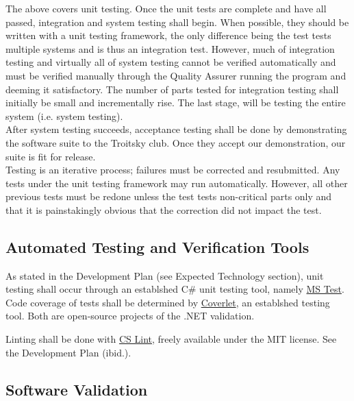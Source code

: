 \documentclass[12pt, titlepage]{article}
\begin{document}
The above covers unit testing. Once the unit tests are complete and have all passed, integration and system testing shall begin. When possible, they should
be written with a unit testing framework, the only difference being the test tests multiple systems and is thus an integration test. However,
much of integration testing and virtually all of system testing cannot be verified automatically and must be verified manually through the Quality Assurer
running the program and deeming it satisfactory. The number of parts tested for integration testing shall initially be small and incrementally rise.
The last stage, will be testing the entire system (i.e. system testing).\\

After system testing succeeds, acceptance testing shall be done by demonstrating the software suite to the Troitsky club.
Once they accept our demonstration, our suite is fit for release.\\

Testing is an iterative process; failures must be corrected and resubmitted. Any tests under the unit testing framework may 
run automatically. However, all other previous tests must be redone unless the test tests non-critical parts only and that
it is painstakingly obvious that the correction did not impact the test.


\subsection{Automated Testing and Verification Tools}


  As stated in the Development Plan (see Expected Technology section), unit testing shall occur through an establshed
  C\# unit testing tool, namely \href{https://learn.microsoft.com/en-us/visualstudio/test/getting-started-with-unit-testing?view=visualstudio&tabs=dotnet%2Cmstest}{MS Test}.
  Code coverage of tests shall be determined by \href{https://github.com/coverlet-coverage/coverlet}{Coverlet}, an establshed testing tool.
  Both are open-source projects of the .NET validation.

  Linting shall be done with \href{https://github.com/lucaspimentel/cslint}{CS Lint}, freely available under the MIT license.
  See the Development Plan (ibid.).

\subsection{Software Validation}
\end{document}
